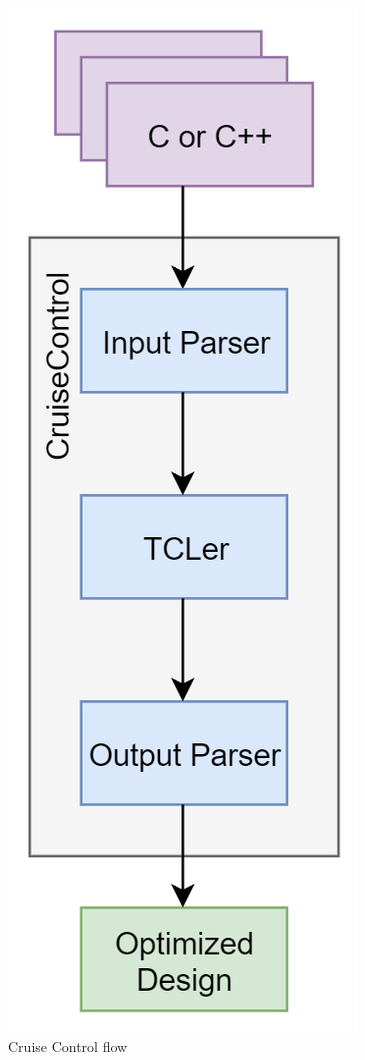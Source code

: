 \documentclass[letterpaper, 10 pt, conference]{IEEEconf}  %
\begin{document}
\begin{figure}[H]
\centering
\includegraphics[scale=.7]{CC_flow.png} 
\caption{Cruise Control  flow}
\end{figure}
\end{document}
